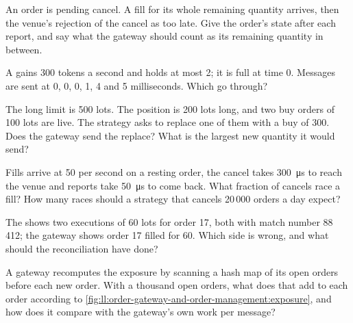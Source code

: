 \begin{exercise}[$\star$]\label{exo:ll:order-gateway-and-order-management:1}
An order is pending cancel. A fill for its whole remaining quantity arrives, then the venue's rejection of the cancel as too
late. Give the order's state after each report, and say what the gateway should count as its remaining quantity in between.
\end{exercise}

\begin{exercise}[$\star$]\label{exo:ll:order-gateway-and-order-management:2}
A  gains 300 tokens a second and holds at most 2; it is full at time 0. Messages are sent at 0, 0, 0, 1, 4 and
5 milliseconds. Which go through?
\end{exercise}

\begin{exercise}[$\star$]\label{exo:ll:order-gateway-and-order-management:3}
The long limit is 500 lots. The position is 200 lots long, and two buy orders of 100 lots are live. The strategy asks to
replace one of them with a buy of 300. Does the gateway send the replace? What is the largest new quantity it would send?
\end{exercise}

\begin{exercise}[$\star\star$]\label{exo:ll:order-gateway-and-order-management:4}
Fills arrive at 50 per second on a resting order, the cancel takes \qty{300}{\micro\second} to reach the venue and reports
take \qty{50}{\micro\second} to come back. What fraction of cancels race a fill? How many races should a strategy that cancels
20\,000 orders a day expect?
\end{exercise}

\begin{exercise}[$\star\star$]\label{exo:ll:order-gateway-and-order-management:5}
The  shows two executions of 60 lots for order 17, both with match number 88\,412; the gateway shows order 17 filled
for 60. Which side is wrong, and what should the reconciliation have done?
\end{exercise}

\begin{exercise}[$\star\star$]\label{exo:ll:order-gateway-and-order-management:6}
A gateway recomputes the exposure by scanning a hash map of its open orders before each new order. With a thousand open orders,
what does that add to each order according to \cref{fig:ll:order-gateway-and-order-management:exposure}, and how does it compare
with the gateway's own work per message?
\end{exercise}

